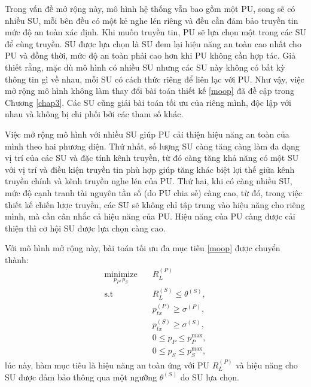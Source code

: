 \documentclass[../main.tex]{subfiles}
\begin{document}
Trong vấn đề mở rộng này, mô hình hệ thống vẫn bao gồm một PU, song sẽ có nhiều SU, mỗi bên đều có một kẻ nghe lén riêng và đều cần đảm bảo truyền tin mức độ an toàn xác định. Khi muốn truyền tin, PU sẽ lựa chọn một trong các SU để cùng truyền. SU được lựa chọn là SU đem lại hiệu năng an toàn cao nhất cho PU và đồng thời, mức độ an toàn phải cao hơn khi PU không cần hợp tác. Giả thiết rằng, mặc dù mô hình có nhiều SU nhưng các SU này không có bất kỳ thông tin gì về nhau, mỗi SU có cách thức riêng để liên lạc với PU. Như vậy, việc mở rộng mô hình không làm thay đổi bài toán thiết kế \eqref{moop} đã đề cập trong Chương \ref{chap3}. Các SU cũng giải bài toán tối ưu của riêng mình, độc lập với nhau và không bị chi phối bởi các tham số khác.

Việc mở rộng mô hình với nhiều SU giúp PU cải thiện hiệu năng an toàn của mình theo hai phương diện. Thứ nhất, số lượng SU càng tăng càng làm đa dạng vị trí của các SU và đặc tính kênh truyền, từ đó càng tăng khả năng có một SU với vị trí và điều kiện truyền tin phù hợp giúp tăng khác biệt lợi thế giữa kênh truyền chính và kênh truyền nghe lén của PU. Thứ hai, khi có càng nhiều SU, mức độ cạnh tranh tài nguyên tần số (do PU chia sẻ) càng cao, từ đó, trong việc thiết kế chiến lược truyền, các SU sẽ không chỉ tập trung vào hiệu năng cho riêng mình, mà cần cân nhắc cả hiệu năng của PU. Hiệu năng của PU càng được cải thiện thì cơ hội SU được lựa chọn càng cao.

Với mô hình mở rộng này, bài toán tối ưu đa mục tiêu \eqref{moop} được chuyển thành:
\begin{subequations}\label{competitive}
\begin{align}
\underset{p_P, p_S}{\text{minimize}} \quad & R_{L}^{(P)} \label{competitive:popt} \\
\text{s.t} \quad & R_{L}^{(S)} \le \theta^{(S)}, \label{competitive:sopt} \\
\quad & p_{tx}^{(P)} \geq \sigma^{(P)}, \label{competitive:ptxp} \\
\quad & p_{tx}^{(S)} \geq \sigma^{(S)}, \label{competitive:ptxs} \\
\quad & 0 \leq p_P \leq p_P^\text{max}, \label{competitive:pp} \\
\quad & 0 \leq p_S \leq p_S^\text{max}, \label{competitive:ps}
\end{align}
\end{subequations}
lúc này, hàm mục tiêu là hiệu năng an toàn ứng với PU $R_{L}^{(P)}$ và hiệu năng cho SU được đảm bảo thông qua một ngưỡng $\theta^{(S)}$ do SU lựa chọn. 
\end{document}
